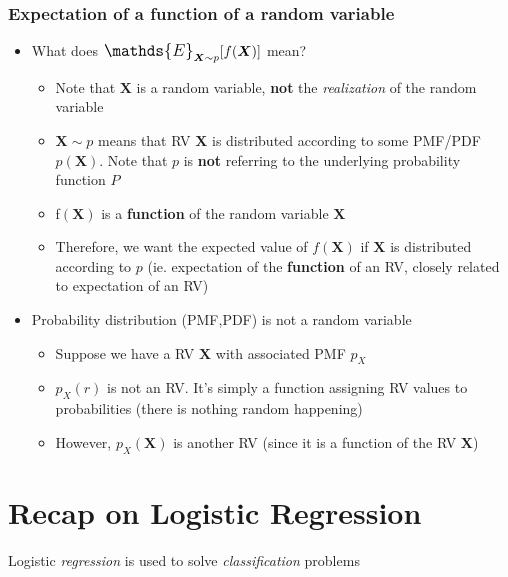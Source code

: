\documentclass{article}
\begin{document}
\subsubsection{Expectation of a function of a random variable}
\begin{itemize}
    \item What does $\mathlarger{\mathlarger{\mathds{E}}_{\boldsymbol{X} \sim p}[f(\boldsymbol{X})]}$ mean?
        \begin{itemize}
            \item Note that $\boldsymbol{X}$ is a random variable, \textbf{not} the \textit{realization} of the random variable
            \item $\boldsymbol{X} \sim p$ means that RV $\boldsymbol{X}$ is distributed according to some PMF/PDF $p(\boldsymbol{X})$. Note that $p$ is \textbf{not} referring to the underlying probability function $P$
            \item f$(\boldsymbol{X})$ is a \textbf{function} of the random variable $\boldsymbol{X}$
            \item Therefore, we want the expected value of $f(\boldsymbol{X})$ if $\boldsymbol{X}$ is distributed according to $p$ (ie. expectation of the \textbf{function} of an RV, closely related to expectation of an RV)
        \end{itemize}
    \item Probability distribution (PMF,PDF) is not a random variable
        \begin{itemize}
            \item Suppose we have a RV $\boldsymbol{X}$ with associated PMF $p_{X}$
            \item $p_{X}(r)$ is not an RV. It's simply a function assigning RV values to probabilities (there is nothing random happening)
            \item However, $p_{X}(\boldsymbol{X})$ is another RV (since it is a function of the RV $\boldsymbol{X}$)
        \end{itemize}
\end{itemize}

\newpage
\section{Recap on Logistic Regression}
Logistic \textit{regression} is used to solve \textit{classification} problems
\end{document}
